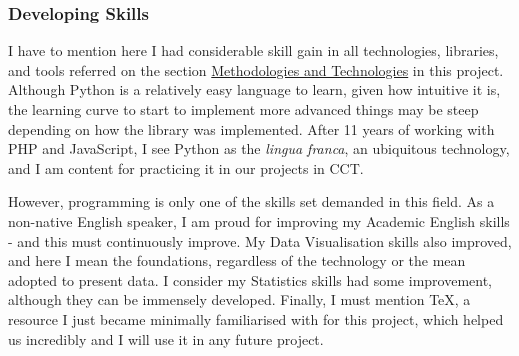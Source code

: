 \documentclass{article}
\begin{document}
\subsubsection{Developing Skills}

I have to mention here I had considerable skill gain in all technologies, libraries, and tools referred on the section \hyperref[sec:methodtech]{Methodologies and Technologies} in this project. Although Python is a relatively easy language to learn, given how intuitive it is, the learning curve to start to implement more advanced things may be steep depending on how the library was implemented. After 11 years of working with PHP and JavaScript, I see Python as the \emph{lingua franca}, an ubiquitous technology, and I am content for practicing it in our projects in CCT.

However, programming is only one of the skills set demanded in this field. As a non-native English speaker, I am proud for improving my Academic English skills - and this must continuously improve. My Data Visualisation skills also improved, and here I mean the foundations, regardless of the technology or the mean adopted to present data. I consider my Statistics skills had some improvement, although they can be immensely developed. Finally, I must mention TeX, a resource I just became minimally familiarised with for this project, which helped us incredibly and I will use it in any future project.
\end{document}
